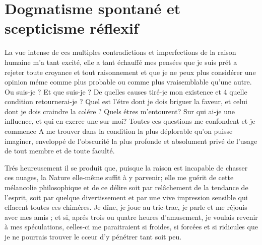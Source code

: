 
\section{Dogmatisme spontané et scepticisme réflexif}

La vue intense de ces multiples contradictions et imperfections
de la raison humaine m’a tant excité, elle a tant
échauffé mes pensées que je suis prét a rejeter toute
croyance et tout raisonnement et que je ne peux plus
considérer une opinion méme comme plus probable ou
comme plus vraisemblable qu’une autre. Ou suis-je ?
Et que suis-je ? De quelles causes tiré-je mon existence
et 4 quelle condition retournerai-je ? Quel est l’étre dont
je dois briguer la faveur, et celui dont je dois craindre la
colére ? Quels étres m’entourent? Sur qui ai-je une
influence, et qui en exerce une sur moi? Toutes ces
questions me confondent et je commence A me trouver
dans la condition la plus déplorable qu’on puisse imaginer,
enveloppé de l’obscurité la plus profonde et absolument
privé de l’usage de tout membre et de toute
faculté.

Trés heureusement il se produit que, puisque la raison
est incapable de chasser ces nuages, la Nature elle-même
suffit à y parvenir; elle me guérit de cette mélancolie
philosophique et de ce délire soit par relâchement de la
tendance de l’esprit, soit par quelque divertissement et
par une vive impression sensible qui effacent toutes ces
chiméres. Je dîne, je joue au tric-trac, je parle et me réjouis
avec mes amis ; et si, aprés trois ou quatre heures d’amusement,
je voulais revenir à mes spéculations, celles-ci
me paraitraient si froides, si forcées et si ridicules que
je ne pourrais trouver le cceur d’y pénétrer tant soit
peu.

